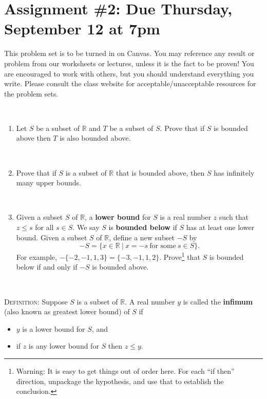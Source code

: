 \documentclass[12pt]{amsart}
\newcommand{\R}{\mathbb{R}}
\newcommand{\showsol}[1]{\def\displaysol{#1}}
\begin{document}
\showsol{1}
	
	\thispagestyle{empty}
	
	\section*{Assignment \#2: Due Thursday, September 12 at 7pm}
	
	This problem set is to be turned in on Canvas. You may reference any result or problem from our worksheets or lectures, unless it is the fact to be proven! You are encouraged to work with others, but you should understand everything you write. Please consult the class website for acceptable/unacceptable resources for the problem sets.
	
	\
	
	



\begin{enumerate}
\item Let $S$ be a subset of $\R$ and $T$ be a subset of $S$. Prove that if $S$ is bounded above
then $T$ is also bounded above.

\

\item Prove that if $S$ is a subset of $\R$ that is bounded above, then $S$ has infinitely many upper bounds.

\

\item Given a subset $S$ of $\R$, a \textbf{lower bound} for $S$ is a real number $z$ such that $z \leq s$ for all $s \in S$.
We say $S$ is \textbf{bounded below} if $S$ has at least one lower bound.
Given a subset $S$ of $\R$, define a new subset $-S$ by
\[-S = \{x \in \R \ | \ x = -s \ \text{for some} \ s \in S\}.\]
For example, $- \{-2,-1, 1, 3\} = \{-3, -1, 1, 2\}.$
Prove\footnote{Warning: It is easy to get things out of order here. For each ``if then'' direction, unpackage the hypothesis, and use that to establish the conclusion.} that $S$ is bounded below if and only if $-S$ is bounded above.
\end{enumerate}

\

\noindent \textsc{Definition:} Suppose $S$ is a subset of $\R$. A real number $y$ is called the \textbf{infimum} (also known as greatest
lower bound) of $S$ if
\begin{itemize}
\item $y$ is a lower bound for $S$, and
\item if $z$ is any lower bound for $S$ then $z \leq y$.
\end{itemize}
\end{document}
